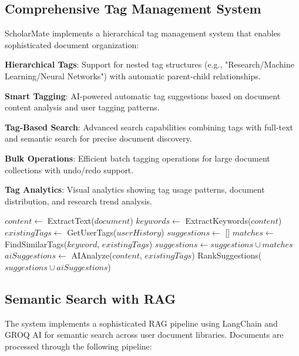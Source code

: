 \documentclass[conference]{IEEEtran}
\begin{document}
\subsection{Comprehensive Tag Management System}

ScholarMate implements a hierarchical tag management system that enables sophisticated document organization:

\textbf{Hierarchical Tags}: Support for nested tag structures (e.g., "Research/Machine Learning/Neural Networks") with automatic parent-child relationships.

\textbf{Smart Tagging}: AI-powered automatic tag suggestions based on document content analysis and user tagging patterns.

\textbf{Tag-Based Search}: Advanced search capabilities combining tags with full-text and semantic search for precise document discovery.

\textbf{Bulk Operations}: Efficient batch tagging operations for large document collections with undo/redo support.

\textbf{Tag Analytics}: Visual analytics showing tag usage patterns, document distribution, and research trend analysis.

\begin{algorithm}[htbp]
\caption{Smart Tag Suggestion Algorithm}
\begin{algorithmic}[1]
    \State $content \gets$ ExtractText($document$)
    \State $keywords \gets$ ExtractKeywords($content$)
    \State $existingTags \gets$ GetUserTags($userHistory$)
    \State $suggestions \gets$ []
        \State $matches \gets$ FindSimilarTags($keyword$, $existingTags$)
        \State $suggestions \gets suggestions \cup matches$
    \EndFor
    \State $aiSuggestions \gets$ AIAnalyze($content$, $existingTags$)
    \State \Return RankSuggestions($suggestions \cup aiSuggestions$)
\EndProcedure
\end{algorithmic}
\end{algorithm}

\subsection{Semantic Search with RAG}

The system implements a sophisticated RAG pipeline using LangChain and GROQ AI for semantic search across user document libraries. Documents are processed through the following pipeline:
\end{document}

